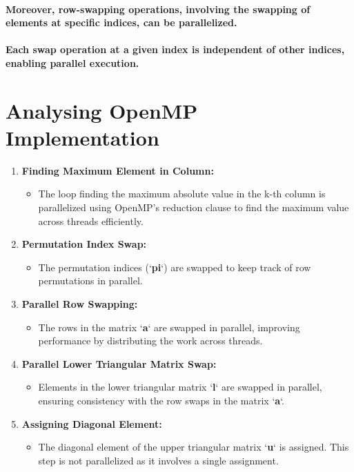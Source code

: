 \documentclass[12pt]{article}
\begin{document}
\paragraph{Moreover, row-swapping operations, involving the swapping of elements at specific indices, can be parallelized.}
\paragraph{Each swap operation at a given index is independent of other indices, enabling parallel execution.}

\section{Analysing OpenMP Implementation}
\begin{enumerate}
    \item \textbf{Finding Maximum Element in Column:}
    \begin{itemize}
        \item The loop finding the maximum absolute value in the k-th column is parallelized using OpenMP's reduction clause to find the maximum value across threads efficiently.
    \end{itemize}
    \item \textbf{Permutation Index Swap:}
    \begin{itemize}
        \item The permutation indices (`\textbf{pi}`) are swapped to keep track of row permutations in parallel.
    \end{itemize}
    \item \textbf{Parallel Row Swapping:}
    \begin{itemize}
        \item The rows in the matrix `\textbf{a}` are swapped in parallel, improving performance by distributing the work across threads.
    \end{itemize}
    \item \textbf{Parallel Lower Triangular Matrix Swap:}
    \begin{itemize}
        \item Elements in the lower triangular matrix `\textbf{l}` are swapped in parallel, ensuring consistency with the row swaps in the matrix `\textbf{a}`.
    \end{itemize}
    \item \textbf{Assigning Diagonal Element:}
    \begin{itemize}
        \item The diagonal element of the upper triangular matrix `\textbf{u}` is assigned. This step is not parallelized as it involves a single assignment.

\end{itemize}
\end{enumerate}
\end{document}
